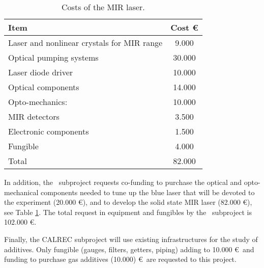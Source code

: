 \begin{table}[h!]
\begin{center}
\begin{tabular}{|l|c|}
\hline
 Item & Cost \euro  \\
 \hline
Laser and nonlinear crystals for MIR range &  9.000 \\
Optical pumping systems & 30.000 \\
Laser diode driver & 10.000  \\
Optical components &14.000 \\
Opto-mechanics: &10.000 \\
MIR detectors & 3.500 \\
Electronic components & 1.500\\
Fungible & 4.000 \\
  \hline
 Total &  82.000 \\
 \hline \hline
\end{tabular}  
\caption{Costs of the MIR laser.}
\label{tab.MIR}
\end{center}
\end{table} 

In addition, the \BATA\ subproject requests co-funding to purchase the optical and opto-mechanical components needed to tune up the blue laser that will be devoted to the experiment (20.000 \euro), and to develop the solid state MIR laser (82.000 \euro), see Table \ref{tab.MIR}. The total request in equipment and fungibles by the \BATA\ subproject is 102.000 \euro.

Finally, the CALREC subproject will use existing infrastructures for the study of additives. Only fungible (gauges, filters, getters, piping) adding to 10.000 \euro\ and funding to purchase gas additives (10.000) \euro\ are requested to this project. 